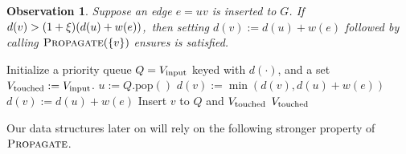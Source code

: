 \documentclass[11pt,letterpaper]{article}
\theoremstyle{plain}
\newtheorem{observation}[theorem]{Observation}
\newcommand{\wei}{w}
\DeclareMathOperator*{\PD}{\textsc{Propagate}}
\begin{document}
\begin{observation}\label{obs:insert}
Suppose an edge  $e=uv$ is inserted to $G$. If $d(v)>(1+\epsp)(d(u)+\wei(e))$,~then setting $d(v):=d(u)+\wei(e)$ followed by
calling $\PD(\{v\})$ ensures  is satisfied.
\end{observation}
\begin{algorithm}[b]
\caption{$\PD(\Vinput)$}\label{alg:propagate-additive}
\begin{algorithmic}[1]
  \State Initialize a priority queue $Q=V_{\mathrm{input}}$ keyed with $d(\cdot)$, and a set $V_{\mathrm{touched}}:=V_{\mathrm{input}}$.
    \State $u:=Q.\text{pop}()$
        \State $d(v):=\min(d(v),d(u)+\wei(e))$ 
      \ElsIf{$d(v)>(1+\epsp)(d(u)+\wei(e))$}
        \State $d(v):=d(u)+\wei(e)$
        \State Insert $v$ to $Q$ and $V_{\mathrm{touched}}$
      \EndIf
    \EndFor
  \EndWhile
  \Return $V_{\mathrm{touched}}$
\end{algorithmic}
\end{algorithm}
Our data structures later on will rely on the following stronger property of $\PD$.
\end{document}

